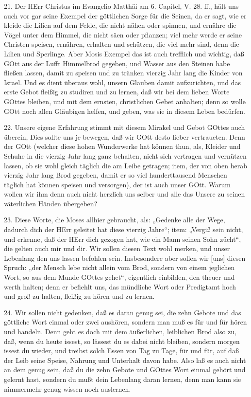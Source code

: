 21. Der HErr Christus im Evangelio Matthäi am 6. Capitel, V. 28. ff., hält uns auch vor gar seine Exempel der göttlichen Sorge für die Seinen, da er sagt, wie er kleide die Lilien auf dem Felde, die nicht nähen oder spinnen, und ernähre die Vögel unter dem Himmel, die nicht säen oder pflanzen; viel mehr werde er seine Christen speisen, ernähren, erhalten und schützen, die viel mehr sind, denn die Lilien und Sperlinge. Aber Mosis Exempel das ist auch trefflich und wichtig, daß GOtt aus der Lufft Himmelbrod gegeben, und Wasser aus den Steinen habe fließen lassen, damit zu speisen und zu tränken vierzig Jahr lang die Kinder von Israel. Und es dient überaus wohl, unsern Glauben damit aufzurichten, und das erste Gebot fleißig zu studiren und zu lernen, daß wir bei dem lieben Worte GOttes bleiben, und mit dem ernsten, christlichen Gebet anhalten; denn so wolle GOtt noch allen Gläubigen helfen, und geben, was sie in diesem Leben bedürfen.

22. Unsere eigene Erfahrung stimmt mit diesem Mirakel und Gebot GOttes auch überein, Dies sollte uns je bewegen, daß wir GOtt desto lieber vertraueten. Denn der GOtt (welcher diese hohen Wunderwerke hat können thun, als, Kleider und Schuhe in die vierzig Jahr lang ganz behalten, nicht sich vertragen und vernützen lassen, ob sie wohl gleich täglich die am Leibe getragen; item, der von oben herab vierzig Jahr lang Brod gegeben, damit er so viel hunderttausend Menschen täglich hat können speisen und versorgen), der ist auch unser GOtt. Warum wollen wir ihm denn auch nicht herzlich uns selber und alle das Unsere zu seinen väterlichen Händen übergeben?

23. Diese Worte, die Moses allhier gebraucht, als: „Gedenke alle der Wege, dadurch dich der HErr geleitet hat diese vierzig Jahre“; item: „Vergiß sein nicht, und erkenne, daß der HErr dich gezogen hat, wie ein Mann seinen Sohn zücht“, die gelten auch mir und dir. Wir sollen diesen Text wohl merken, und unser Lebenlang den uns lassen befohlen sein. Insbesondere aber sollen wir [uns] diesen Spruch: „der Mensch lebe nicht allein vom Brod, sondern von einem jeglichen Wort, so aus dem Munde GOttes gehet“, eigentlich einbilden, den theuer und werth halten; denn er befiehlt uns, das mündliche Wort oder Predigtamt hoch und groß zu halten, fleißig zu hören und zu lernen.

24. Wir sollen nicht gedenken, daß es daran genug sei, die zehn Gebote und das göttliche Wort einmal oder zwei aushören, sondern man muß es für und für hören und handeln. Denn geht es doch mit dem äußerlichen, leiblichen Brod also zu, daß, wenn du heute issest, so lässest du es dabei nicht bleiben, sondern morgen issest du wieder, und treibst solch Essen von Tag zu Tage, für und für, auf daß der Leib seine Speise, Nahrung und Unterhalt davon habe. Also laß es auch nicht an dem genug sein, daß du die zehn Gebote und GOttes Wort einmal gehört und gelernt hast, sondern du mußt dein Lebenlang daran lernen, denn man kann sie nimmermehr genug wissen noch auslernen.

